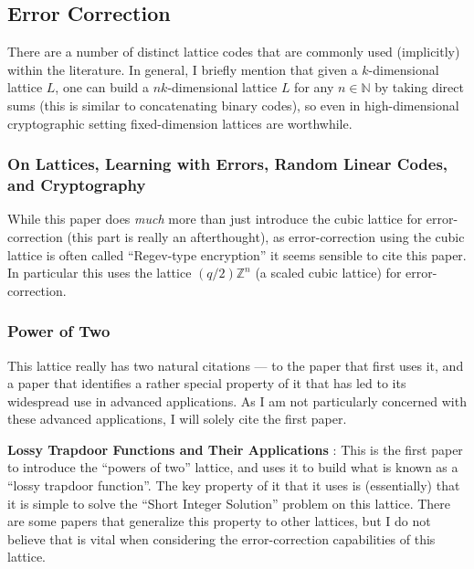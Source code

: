 \documentclass{article}
\begin{document}
\subsection{Error Correction}
There are a number of distinct lattice codes that are commonly used (implicitly) within the literature.
In general, I briefly mention that given a $k$-dimensional lattice $L$, one can build a $nk$-dimensional lattice $L$ for any $n\in\mathbb{N}$ by taking direct sums (this is similar to concatenating binary codes), so even in high-dimensional cryptographic setting fixed-dimension lattices are worthwhile.

\subsubsection{On Lattices, Learning with Errors, Random Linear Codes, and Cryptography \cite{regev_lattices_nodate}}
While this paper does \emph{much} more than just introduce the cubic lattice for error-correction (this part is really an afterthought), as error-correction using the cubic lattice is often called ``Regev-type encryption'' it seems sensible to cite this paper.
In particular this uses the lattice $(q/2)\mathbb{Z}^n$ (a scaled cubic lattice) for error-correction.


\subsubsection{Power of Two}
This lattice really has two natural citations --- to the paper that first uses it, and a paper that identifies a rather special property of it that has led to its widespread use in advanced applications.
As I am not particularly concerned with these advanced applications, I will solely cite the first paper.

\textbf{Lossy Trapdoor Functions and Their Applications} \cite{peikert_lossy_nodate}:
This is the first paper to introduce the ``powers of two'' lattice, and uses it to build what is known as a ``lossy trapdoor function''.
The key property of it that it uses is (essentially) that it is simple to solve the ``Short Integer Solution'' problem on this lattice.
There are some papers that generalize this property to other lattices, but I do not believe that is vital when considering the error-correction capabilities of this lattice.
\end{document}
